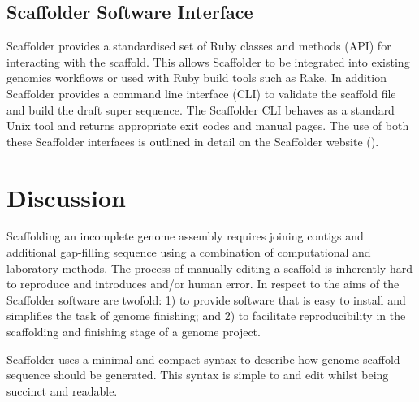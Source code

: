 \documentclass[10pt]{bmc_article}
\newenvironment{bmcformat}{\begin{raggedright}\baselineskip20pt\sloppy\setboolean{publ}{false}}{\end{raggedright}\baselineskip20pt\sloppy}
\begin{document}
\begin{bmcformat}
\subsection*{Scaffolder Software Interface} %

Scaffolder provides a standardised set of Ruby classes and methods (API) for
interacting with the scaffold. This allows Scaffolder to be integrated into
existing genomics workflows or used with Ruby build tools such as Rake. In
addition Scaffolder provides a command line interface (CLI) to validate the
scaffold file and build the draft super sequence. The Scaffolder CLI behaves
as a standard Unix tool and returns appropriate exit codes and manual pages.
The use of both these Scaffolder interfaces is outlined in detail on the
Scaffolder website (\scaffolder).  \pb

\clearpage

\section*{Discussion} %

Scaffolding an incomplete genome assembly requires joining contigs and
additional gap-filling sequence using a combination of computational and
laboratory methods. The process of manually editing a scaffold is inherently
hard to reproduce and introduces  and/or human error. In respect to
 the aims of the Scaffolder software are
twofold: 1) to provide software that is easy to install and simplifies the
task of genome finishing; and 2) to facilitate reproducibility in the
scaffolding and finishing stage of a genome project. \pb

 Scaffolder  uses a minimal and
compact syntax to describe how  genome scaffold sequence should
be generated. This syntax is simple to  and edit
whilst being succinct and readable. 

 \pb


\end{bmcformat}
\end{document}
